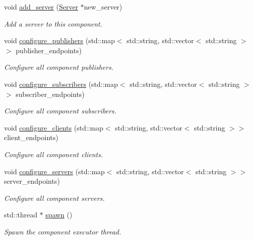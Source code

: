 \begin{DoxyCompactItemize}
void \hyperlink{classzcm_1_1Component_a31989e75d9de6093cb712148cd94da71}{add\+\_\+server} (\hyperlink{classzcm_1_1Server}{Server} $\ast$new\+\_\+server)
\begin{DoxyCompactList}\small\item\em Add a server to this component. \end{DoxyCompactList}\item 
void \hyperlink{classzcm_1_1Component_a64674700fb1edd7c84a64ce78aa5b2f4}{configure\+\_\+publishers} (std\+::map$<$ std\+::string, std\+::vector$<$ std\+::string $>$$>$ publisher\+\_\+endpoints)
\begin{DoxyCompactList}\small\item\em Configure all component publishers. \end{DoxyCompactList}\item 
void \hyperlink{classzcm_1_1Component_a25c31193982bb317186f4f3b4d8d790c}{configure\+\_\+subscribers} (std\+::map$<$ std\+::string, std\+::vector$<$ std\+::string $>$$>$ subscriber\+\_\+endpoints)
\begin{DoxyCompactList}\small\item\em Configure all component subscribers. \end{DoxyCompactList}\item 
void \hyperlink{classzcm_1_1Component_ad3ed49fb7e936de3fd66ac4e37974735}{configure\+\_\+clients} (std\+::map$<$ std\+::string, std\+::vector$<$ std\+::string $>$$>$ client\+\_\+endpoints)
\begin{DoxyCompactList}\small\item\em Configure all component clients. \end{DoxyCompactList}\item 
void \hyperlink{classzcm_1_1Component_a9a8df5c1a899ec4470dd5bbcd90e9e79}{configure\+\_\+servers} (std\+::map$<$ std\+::string, std\+::vector$<$ std\+::string $>$$>$ server\+\_\+endpoints)
\begin{DoxyCompactList}\small\item\em Configure all component servers. \end{DoxyCompactList}\item 
std\+::thread $\ast$ \hyperlink{classzcm_1_1Component_a328d6f79aab5455e96a2badfdb6bb451}{spawn} ()
\begin{DoxyCompactList}\small\item\em Spawn the component executor thread. \end{DoxyCompactList}\end{DoxyCompactItemize}
